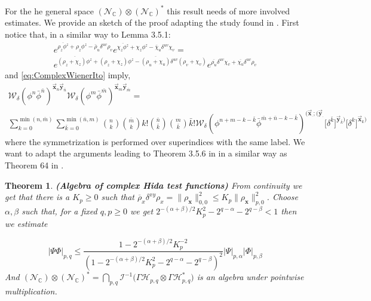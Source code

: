 \documentclass{elsarticle}%
\newtheorem{theorem}{Theorem}[section]%
\begin{document}
For the he general space   $(\mathcal{N}_\mathbb{C})\otimes (\mathcal{N}_\mathbb{C})^*$ this result needs of more involved estimates. We provide an sketch of the proof adapting the study found in \cite{obataWhiteNoise1994}. First notice that, in a similar way to  \cite{obataWhiteNoise1994} Lemma 3.5.1:
\begin{multline}
 e^{\overline{\rho_z\phi^z}+\rho_z\phi^z-\bar\rho_u\delta^{uv}\rho_v}
 e^{\overline{\chi_z\phi^z}+\chi_z\phi^z-\bar\chi_u\delta^{uv}\chi_v}
=\\
e^{\overline{(\rho_z+\chi_z)\phi^z}+(\rho_z+\chi_z)\phi^z-\overline{(\rho_u+\chi_u)}\delta^{uv}(\rho_v+\chi_v)}e^{\overline{\rho_u}\delta^{uv}\chi_v+\overline{\chi_u}\delta^{uv}\rho_v}
\end{multline}
and \eqref{eq:ComplexWienerIto} imply, 
 \begin{multline*}
    \mathcal{W}_\delta(\phi^n\bar{\phi}^{\bar{n}})^{\vec{\mathbf{x}}_n\vec{\mathbf{y}}_{\bar{n}}}\mathcal{W}_\delta(\phi^m\bar{\phi}^{\bar{m}})^{\vec{\mathbf{x}}_m\vec{\mathbf{y}}_{\bar{m}}}=\\
    \sum_{k=0}^{\min({n},\bar{m})}\sum_{\bar k=0}^{\min(\bar{n},{m})} \binom{n}{k}\binom{\bar{m}}{k} k! \binom{\bar{n}}{\bar k}\binom{{m}}{\bar k} \bar k! \mathcal{W}_\delta(\phi^{n+m-k-\bar{k}}\bar{\phi}^{\bar{m}+\bar{n}-k-\bar{k}})^{(\vec{\mathbf{x}}_\cdot;(\vec{\mathbf{y}}_{\cdot}} \big[\delta^{\bar k}\big]^{ \vec{\mathbf{y}}_{\bar{k}})}
    \big[\delta^{k}\big]^{ \vec{\mathbf{x}}_{{k}})}
\end{multline*}
where the symmetrization is performed over superindices with the same label. 
We want to adapt the arguments leading to Theorem 3.5.6 in \cite{obataWhiteNoise1994} in a similar way as Theorem 64 in  \cite{westerkampRecentResults2003}. 
\begin{theorem}\textbf{(Algebra of complex Hida test functions)} 
    From continuity we get 
that there is a $K_p\geq 0$ such that   ${\overline{\rho}_{{x}}\delta^{xy}\rho_{{x}}}= \lVert \rho_{\mathbf{x}} \rVert_{0,0}^2\leq K_p \lVert \rho_{\mathbf{x}} \rVert_{p,0}^2 $. Choose $\alpha, \beta$ such that, for a fixed $q,p\geq 0$ we get $2^{-(\alpha+\beta)/2}K_p^{2} -2^{q-\alpha}-2^{q-\beta}< 1$ then we estimate 

\begin{equation}
    \lvert \Psi\Phi\rvert_{p,q} \leq \frac{1-2^{-(\alpha+\beta)/2 }K_p^{-2}}{(1-2^{-(\alpha+\beta)/2}K_p^{2} -2^{q-\alpha}-2^{q-\beta})^2} \lvert \Psi\lvert_{p,\alpha} \lvert\Phi\rvert_{p,\beta}
\end{equation}
And $(\mathcal{N}_\mathbb{C})\otimes (\mathcal{N}_\mathbb{C})^*= \bigcap\limits_{p,q} \mathcal{I}^{-1}\Big( \Gamma\mathcal{H}_{p,q}\otimes \Gamma\mathcal{H}_{p,q}^* \Big)$ is an algebra under pointwise multiplication. \end{theorem}
\end{document}
